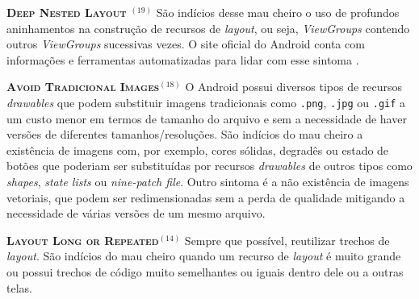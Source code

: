   \noindent
  \textbf{\textsc{{\small Deep Nested Layout
}}}$^{(19)}$
      São indícios desse mau cheiro o uso de profundos aninhamentos na construção de recursos de \textit{layout}, ou seja, \textit{ViewGroups} contendo outros \textit{ViewGroups} sucessivas vezes. O site oficial do Android conta com informações e ferramentas automatizadas para lidar com esse sintoma \cite{OptmizingViewHierarchies}.


  \noindent
  \textbf{\textsc{{\small Avoid Tradicional Images}}}$^{(18)}$
      O Android possui diversos tipos de recursos \textit{drawables} que podem substituir imagens tradicionais como \texttt{.png}, \texttt{.jpg} ou \texttt{.gif} a um custo menor em termos de tamanho do arquivo e sem a necessidade de haver versões de diferentes tamanhos/resoluções. São indícios do mau cheiro a existência de imagens com, por exemplo, cores sólidas, degradês ou estado de botões que poderiam ser substituídas por recursos \textit{drawables} de outros tipos como \textit{shapes}, \textit{state lists} ou \textit{nine-patch file}. Outro sintoma é a não existência de imagens vetoriais, que podem ser redimensionadas sem a perda de qualidade mitigando a necessidade de várias versões de um mesmo arquivo.


  \noindent
  \textbf{\textsc{{\small Layout Long or Repeated}}}$^{(14)}$
      Sempre que possível, reutilizar trechos de \textit{layout}. São indícios do mau cheiro quando um recurso de \textit{layout} é muito grande ou possui trechos de código muito semelhantes ou iguais dentro dele ou a outras telas.

